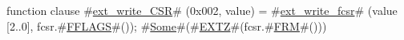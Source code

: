 function clause #\hyperref[sailRISCVzextzywritezyCSR]{ext\_write\_CSR}# (0x002, value) = { #\hyperref[sailRISCVzextzywritezyfcsr]{ext\_write\_fcsr}# (value [2..0], fcsr.#\hyperref[sailRISCVzFFLAGS]{FFLAGS}#()); #\hyperref[sailRISCVzSome]{Some}#(#\hyperref[sailRISCVzEXTZ]{EXTZ}#(fcsr.#\hyperref[sailRISCVzFRM]{FRM}#())) }
